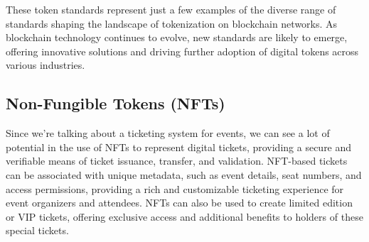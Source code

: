 These token standards represent just a few examples of the diverse range of standards shaping the landscape of tokenization on blockchain networks. As blockchain technology continues to evolve, new standards are likely to emerge, offering innovative solutions and driving further adoption of digital tokens across various industries.

\subsection{Non-Fungible Tokens (NFTs)}
\label{subsec:nfts}

Since we're talking about a ticketing system for events, we can see a lot of potential in the use of NFTs to represent digital tickets, providing a secure and verifiable means of ticket issuance, transfer, and validation. NFT-based tickets can be associated with unique metadata, such as event details, seat numbers, and access permissions, providing a rich and customizable ticketing experience for event organizers and attendees. NFTs can also be used to create limited edition or VIP tickets, offering exclusive access and additional benefits to holders of these special tickets.
